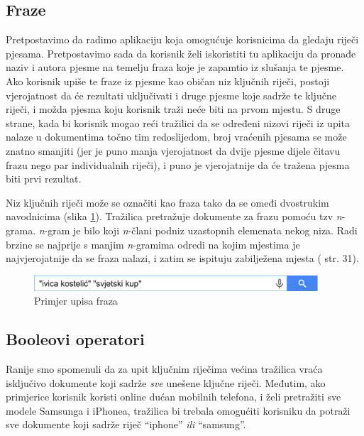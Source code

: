 \documentclass[a4paper,twoside,12pt]{scrreprt}
\begin{document}
\subsection{Fraze}

Pretpostavimo da radimo aplikaciju koja omogućuje korisnicima da gledaju riječi pjesama. Pretpostavimo sada da korisnik želi iskoristiti tu aplikaciju da pronađe naziv i autora pjesme na temelju fraza koje je zapamtio iz slušanja te pjesme. Ako korisnik upiše te fraze iz pjesme kao običan niz ključnih riječi, postoji vjerojatnost da će rezultati uključivati i druge pjesme koje sadrže te ključne riječi, i možda pjesma koju korisnik traži neće biti na prvom mjestu. S druge strane, kada bi korisnik mogao reći tražilici da se određeni nizovi riječi iz upita nalaze u dokumentima točno tim redoslijedom, broj vraćenih pjesama se može znatno smanjiti (jer je puno manja vjerojatnost da dvije pjesme dijele čitavu frazu nego par individualnih riječi), i puno je vjerojatnije da će tražena pjesma biti prvi rezultat.

Niz ključnih riječi može se označiti kao fraza tako da se omeđi dvostrukim navodnicima (slika \ref{phrases}). Tražilica pretražuje dokumente za frazu pomoću tzv \textit{n}-grama. \textit{n}-gram je bilo koji \textit{n}-člani podniz uzastopnih elemenata nekog niza. Radi brzine se najprije s manjim \textit{n}-gramima odredi na kojim mjestima je najvjerojatnije da se fraza nalazi, i zatim se ispituju zabilježena mjesta (\cite{taming} str. 31).

\begin{figure}[H]
  \centering
  \includegraphics[width=300pt]{phrases}
  \caption{Primjer upisa fraza}
  \label{phrases}
\end{figure}

\subsection{Booleovi operatori}

Ranije smo spomenuli da za upit ključnim riječima većina tražilica vraća isključivo dokumente koji sadrže \textit{sve} unešene ključne riječi. Međutim, ako primjerice korisnik koristi online dućan mobilnih telefona, i želi pretražiti sve modele Samsunga i iPhonea, tražilica bi trebala omogućiti korisniku da potraži sve dokumente koji sadrže riječ ``iphone'' \textit{ili} ``samsung''.
\end{document}
